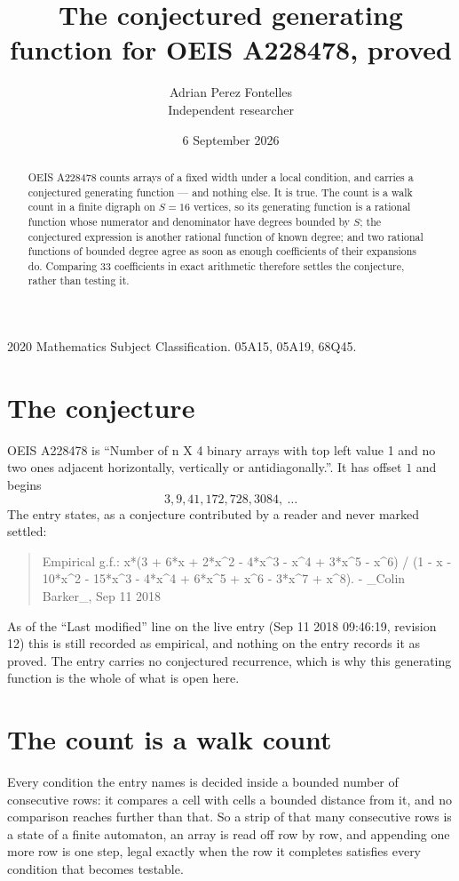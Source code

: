 \documentclass[11pt,a4paper]{article}
\title{The conjectured generating function for OEIS A228478, proved}
\author{Adrian Perez Fontelles\\ \small Independent researcher}
\date{6 September 2026}
\theoremstyle{plain}
\theoremstyle{definition}
\begin{document}
\maketitle

\begin{abstract}
OEIS A228478 counts arrays of a fixed width under a local condition, and carries a conjectured
generating function --- and nothing else. It is true. The count is a walk count in a finite
digraph on $S=16$ vertices, so its generating function is a rational function whose numerator
and denominator have degrees bounded by $S$; the conjectured expression is another rational
function of known degree; and two rational functions of bounded degree agree as soon as enough
coefficients of their expansions do. Comparing $33$ coefficients in exact arithmetic
therefore settles the conjecture, rather than testing it.
\end{abstract}

\noindent\small 2020 Mathematics Subject Classification. 05A15, 05A19, 68Q45.\normalsize

\section{The conjecture}

OEIS A228478 is ``Number of n X 4 binary arrays with top left value 1 and no two ones adjacent horizontally, vertically or antidiagonally.''. It has offset $1$ and begins
\[
3, 9, 41, 172, 728, 3084,\ \dots
\]
The entry states, as a conjecture contributed by a reader and never marked settled:
\begin{quote}
Empirical g.f.: x*(3 + 6*x + 2*x\^{}2 - 4*x\^{}3 - x\^{}4 + 3*x\^{}5 - x\^{}6) / (1 - x - 10*x\^{}2 - 15*x\^{}3 - 4*x\^{}4 + 6*x\^{}5 + x\^{}6 - 3*x\^{}7 + x\^{}8). - \_Colin Barker\_, Sep 11 2018
\end{quote}
As of the ``Last modified'' line on the live entry (Sep 11 2018 09:46:19, revision 12) this is still
recorded as empirical, and nothing on the entry records it as proved. The entry carries no
conjectured recurrence, which is why this generating function is the whole of what is open
here.

\section{The count is a walk count}

Every condition the entry names is decided inside a bounded number of consecutive rows: it
compares a cell with cells a bounded distance from it, and no comparison reaches further than
that. So a strip of that many consecutive rows is a state of a finite automaton, an array is
read off row by row, and appending one more row is one step, legal exactly when the row it
completes satisfies every condition that becomes testable.
\end{document}
